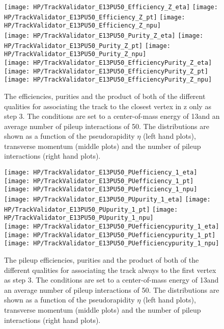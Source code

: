 \begin{figure}[!h]
  \centering
  \texttt{[image: HP/TrackValidator\_E13PU50\_Efficiency\_Z\_eta]}
  \texttt{[image: HP/TrackValidator\_E13PU50\_Efficiency\_Z\_pt]}
  \texttt{[image: HP/TrackValidator\_E13PU50\_Efficiency\_Z\_npu]}
   \\
  \texttt{[image: HP/TrackValidator\_E13PU50\_Purity\_Z\_eta]}
  \texttt{[image: HP/TrackValidator\_E13PU50\_Purity\_Z\_pt]}
  \texttt{[image: HP/TrackValidator\_E13PU50\_Purity\_Z\_npu]}
   \\
  \texttt{[image: HP/TrackValidator\_E13PU50\_EfficiencyPurity\_Z\_eta]}
  \texttt{[image: HP/TrackValidator\_E13PU50\_EfficiencyPurity\_Z\_pt]}
  \texttt{[image: HP/TrackValidator\_E13PU50\_EfficiencyPurity\_Z\_npu]}
  \caption[Efficiencies, purities and their product of the different qualities of the association map with associating to the closest vertex in z only during step 3 with 13\TeV and PU=50]{The efficiencies, purities and the product of both of the different qualities for associating the track to the closest vertex in z only as step 3. The conditions are set to a center-of-mass energy of 13\TeV and an average number of pileup interactions of 50. The distributions are shown as a function of the pseudorapidity $\eta$ (left hand plots), transverse momentum (middle plots) and the number of pileup interactions (right hand plots).}
\end{figure}
\clearpage

\begin{figure}[!h]
  \centering
  \texttt{[image: HP/TrackValidator\_E13PU50\_PUefficiency\_1\_eta]}
  \texttt{[image: HP/TrackValidator\_E13PU50\_PUefficiency\_1\_pt]}
  \texttt{[image: HP/TrackValidator\_E13PU50\_PUefficiency\_1\_npu]}
   \\
  \texttt{[image: HP/TrackValidator\_E13PU50\_PUpurity\_1\_eta]}
  \texttt{[image: HP/TrackValidator\_E13PU50\_PUpurity\_1\_pt]}
  \texttt{[image: HP/TrackValidator\_E13PU50\_PUpurity\_1\_npu]}
   \\
  \texttt{[image: HP/TrackValidator\_E13PU50\_PUefficiencypurity\_1\_eta]}
  \texttt{[image: HP/TrackValidator\_E13PU50\_PUefficiencypurity\_1\_pt]}
  \texttt{[image: HP/TrackValidator\_E13PU50\_PUefficiencypurity\_1\_npu]}
  \caption[Pileup efficiencies, purities and their product of the different qualities of the association map with associating the track always to the first vertex during step 3 with 13\TeV and PU=50]{The pileup efficiencies, purities and the product of both of the different qualities for associating the track always to the first vertex as step 3. The conditions are set to a center-of-mass energy of 13\TeV and an average number of pileup interactions of 50. The distributions are shown as a function of the pseudorapidity $\eta$ (left hand plots), transverse momentum (middle plots) and the number of pileup interactions (right hand plots).}
\end{figure}
\clearpage


